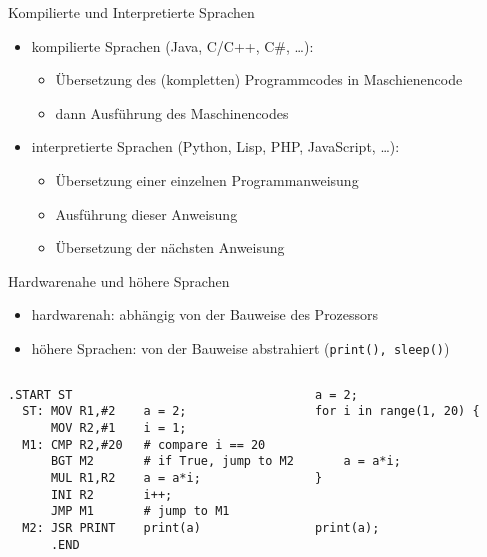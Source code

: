 \begin{frame}[fragile]{Kompilierte und Interpretierte Sprachen}
    \begin{itemize}
        \item kompilierte Sprachen (Java, C/C++, C\#, \dots):
        \begin{itemize}
            \item Übersetzung des (kompletten) Programmcodes in Maschienencode
            \item dann Ausführung des Maschinencodes
        \end{itemize}
        \item interpretierte Sprachen (Python, Lisp, PHP, JavaScript, \dots):
        \begin{itemize}
            \item Übersetzung einer einzelnen Programmanweisung
            \item Ausführung dieser Anweisung
            \item Übersetzung der nächsten Anweisung
        \end{itemize}
    \end{itemize}
\end{frame}

\begin{frame}[fragile]{Hardwarenahe und höhere Sprachen}
\begin{itemize}
    \item hardwarenah: abhängig von der Bauweise des Prozessors
    \item höhere Sprachen: von der Bauweise abstrahiert (\texttt{print(), sleep()})
\end{itemize}
\begin{columns}
    \begin{lstlisting}
.START ST
  ST: MOV R1,#2
      MOV R2,#1
  M1: CMP R2,#20
      BGT M2
      MUL R1,R2
      INI R2
      JMP M1
  M2: JSR PRINT
      .END
    \end{lstlisting}
    \begin{lstlisting}

a = 2;
i = 1;
# compare i == 20
# if True, jump to M2
a = a*i;
i++;
# jump to M1
print(a)
    \end{lstlisting}
    \begin{lstlisting}
a = 2;
for i in range(1, 20) {


    a = a*i;
}
 
 
print(a);

    \end{lstlisting}
\end{columns}
\end{frame}

